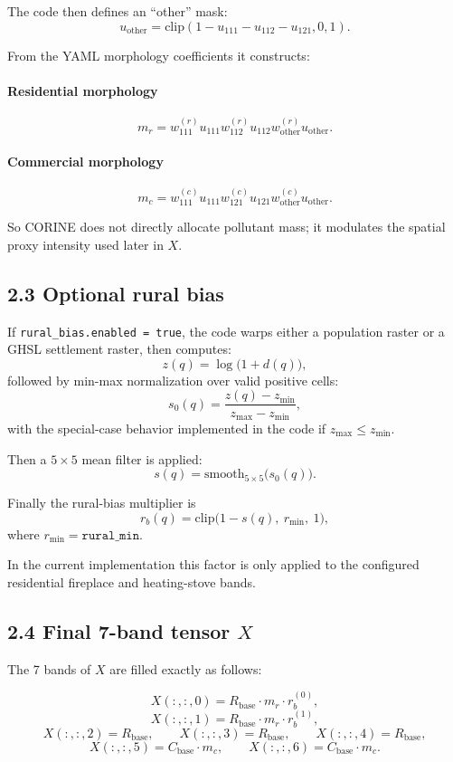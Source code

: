 \documentclass[11pt,a4paper]{article}
\begin{document}
The code then defines an ``other'' mask:
\[
u_{\mathrm{other}} = \mathrm{clip}(1 - u_{111} - u_{112} - u_{121}, 0, 1).
\]

From the YAML morphology coefficients it constructs:

\paragraph{Residential morphology}
\[
m_r =
w^{(r)}_{111} u_{111}
 w^{(r)}_{112} u_{112}
 w^{(r)}_{\mathrm{other}} u_{\mathrm{other}}.
\]

\paragraph{Commercial morphology}
\[
m_c =
w^{(c)}_{111} u_{111}
 w^{(c)}_{121} u_{121}
 w^{(c)}_{\mathrm{other}} u_{\mathrm{other}}.
\]

So CORINE does not directly allocate pollutant mass; it modulates the spatial
proxy intensity used later in $X$.

\subsection{2.3 Optional rural bias}

If \texttt{rural\_bias.enabled = true}, the code warps either a population raster
or a GHSL settlement raster, then computes:
\[
z(q) = \log\bigl(1 + d(q)\bigr),
\]
followed by min-max normalization over valid positive cells:
\[
s_0(q) = \frac{z(q)-z_{\min}}{z_{\max}-z_{\min}},
\]
with the special-case behavior implemented in the code if $z_{\max} \le z_{\min}$.

Then a $5 \times 5$ mean filter is applied:
\[
s(q) = \mathrm{smooth}_{5 \times 5}\bigl(s_0(q)\bigr).
\]

Finally the rural-bias multiplier is
\[
r_b(q) = \mathrm{clip}\bigl(1-s(q),\ r_{\min},\ 1\bigr),
\]
where $r_{\min}=\texttt{rural\_min}$.

In the current implementation this factor is only applied to the configured
residential fireplace and heating-stove bands.

\subsection{2.4 Final 7-band tensor $X$}

The 7 bands of $X$ are filled exactly as follows:

\[
X(:,:,0) = R_{\mathrm{base}} \cdot m_r \cdot r_b^{(0)},
\]
\[
X(:,:,1) = R_{\mathrm{base}} \cdot m_r \cdot r_b^{(1)},
\]
\[
X(:,:,2) = R_{\mathrm{base}},
\qquad
X(:,:,3) = R_{\mathrm{base}},
\qquad
X(:,:,4) = R_{\mathrm{base}},
\]
\[
X(:,:,5) = C_{\mathrm{base}} \cdot m_c,
\qquad
X(:,:,6) = C_{\mathrm{base}} \cdot m_c.
\]
\end{document}
